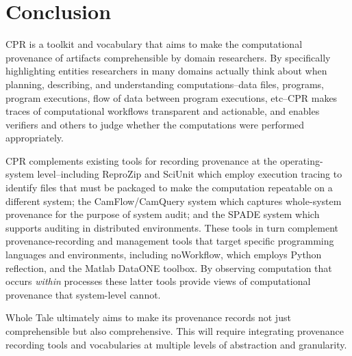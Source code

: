 \section{Conclusion}

CPR is a toolkit and vocabulary that aims to make the computational provenance of artifacts comprehensible by domain researchers. By specifically highlighting entities researchers in many domains actually think about when planning, describing, and understanding computations--data files, programs, program executions, flow of data between program executions, etc--CPR makes traces of computational workflows transparent and actionable, and enables verifiers and others to judge whether the computations were performed appropriately.

CPR complements existing tools for recording provenance at the operating-system level--including ReproZip and SciUnit which employ execution tracing to identify files that must be packaged to make the computation repeatable on a different system; the CamFlow/CamQuery system which captures whole-system provenance for the purpose of system audit; and the SPADE system which supports auditing in distributed environments. These tools in turn complement provenance-recording and management tools that target specific programming languages and environments, including noWorkflow, which employs Python reflection, and the Matlab DataONE toolbox. By observing computation that occurs \emph{within} processes these latter tools provide views of computational provenance that system-level cannot.

Whole Tale ultimately aims to make its provenance records not just comprehensible but also comprehensive. This will require integrating provenance recording tools and vocabularies at multiple levels of abstraction and granularity.

